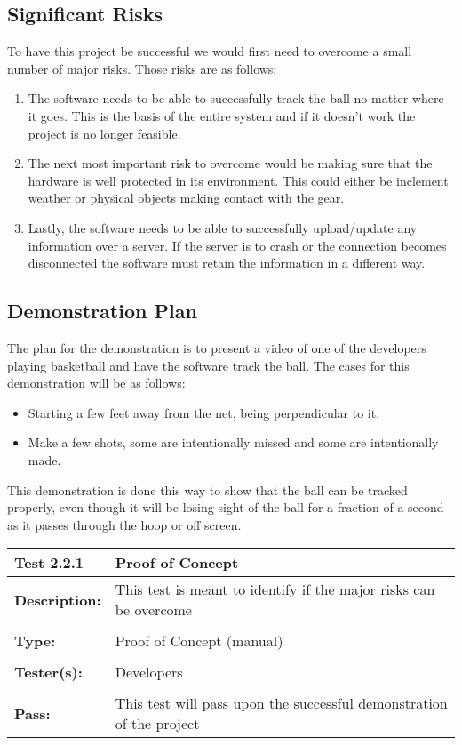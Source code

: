 \documentclass{article}
\begin{document}
\subsection{Significant Risks}
To have this project be successful we would first need to overcome a small number of major risks. Those risks are as follows:
\begin{enumerate}
    \item The software needs to be able to successfully track the ball no matter where it goes. This is the basis of the entire system and if it doesn't work the project is no longer feasible.
    \item The next most important risk to overcome would be making sure that the hardware is well protected in its environment. This could either be inclement weather or physical objects making contact with the gear.
    \item Lastly, the software needs to be able to successfully upload/update any information over a server. If the server is to crash or the connection becomes disconnected the software must retain the information in a different way.
\end{enumerate}

\newpage
\subsection{Demonstration Plan}
The plan for the demonstration is to present a video of one of the developers playing basketball and have the software track the ball. The cases for this demonstration will be as follows:
\begin{itemize}
    \item Starting a few feet away from the net, being perpendicular to it. 
    \item Make a few shots, some are intentionally missed and some are intentionally made.
\end{itemize}


This demonstration is done this way to show that the ball can be tracked properly, even though it will be losing sight of the ball for a fraction of a second as it passes through the hoop or off screen.


\begin{tabularx}{\textwidth}{p{2cm}p{9cm}}
\toprule 
{\bf Test 2.2.1} & {\bf Proof of Concept}\\
\midrule
\textbf{Description:} & This test is meant to identify if the major risks can be overcome \\[0.3\baselineskip]
                      &                     \\
\textbf{Type:} & Proof of Concept (manual)   \\[0.3\baselineskip]
                      &                     \\
\textbf{Tester(s):} & Developers \\[0.3\baselineskip]
                      &                     \\
\textbf{Pass:} & This test will pass upon the successful demonstration of the project \\[0.3\baselineskip]
\bottomrule
\end{tabularx}
\end{document}

